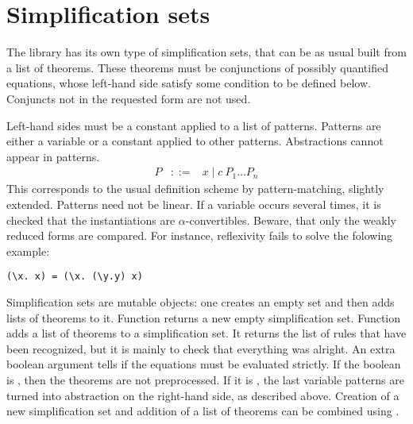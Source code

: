 \section{Simplification sets}

The  library has its own type of simplification sets, that
can be as usual built from a list of theorems. These theorems must be
conjunctions of possibly quantified equations, whose left-hand side
satisfy some condition to be defined below. Conjuncts not in the
requested form are not used.

Left-hand sides must be a constant applied to a list of
patterns. Patterns are either a variable or a constant applied to
other patterns. Abstractions cannot appear in patterns.
\begin{eqnarray*}
P & ::= & x \mid c~P_1 \ldots P_n
\end{eqnarray*}
This corresponds to the usual definition scheme by pattern-matching,
slightly extended. Patterns need not be linear. If a variable occurs
several times, it is checked that the instantiations are
$\alpha$-convertibles. Beware, that only the weakly reduced forms are
compared. For instance, reflexivity fails to solve the folowing example:
\begin{verbatim}
(\x. x) = (\x. (\y.y) x)
\end{verbatim}


Simplification sets are mutable objects: one creates an empty set and
then adds lists of theorems to it. Function  returns a
new empty simplification set. Function  adds a list
of theorems to a simplification set. It returns the list of rules that
have been recognized, but it is mainly to check that everything was
alright. An extra boolean argument tells if the equations must be
evaluated strictly. If the boolean is , then the theorems are
not preprocessed. If it is , the last variable patterns are
turned into abstraction on the right-hand side, as described above.
Creation of a new simplification set and addition of a list of
theorems can be combined using .
